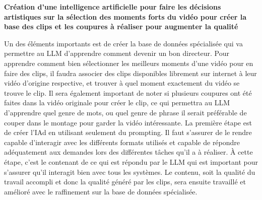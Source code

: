 \documentclass[livre]{udes-genie-these}
\begin{document}
\textbf{Création d'une intelligence artificielle pour faire les décisions artistiques sur la sélection des moments forts du vidéo pour créer la base des clips et les coupures à réaliser pour augmenter la qualité}

Un des éléments importants est de créer la base de données spécialisée qui va permettre au LLM d'apprendre comment devenir un bon directeur.
Pour apprendre comment bien sélectionner les meilleurs moments d'une vidéo pour en faire des clips, il faudra associer des clips disponibles librement sur internet à leur vidéo d'origine respective, et trouver à quel moment exactement du vidéo se trouve le clip. Il sera également important de noter si plusieurs coupures ont été faites dans la vidéo originale pour créer le clip, ce qui permettra au LLM d'apprendre quel genre de mots, ou quel genre de phrase il serait préférable de couper dans le montage pour garder la vidéo intéressante.
La première étape est de créer l'IAd en utilisant seulement du prompting. Il faut s'assurer de le rendre capable d'interagir avec les différents formats utilisés et capable de répondre adéquatement aux demandes lors des différentes tâches qu'il a à réaliser. À cette étape, c'est le contenant de ce qui est répondu par le LLM qui est important pour s'assurer qu'il interagit bien avec tous les systèmes. Le contenu, soit la qualité du travail accompli et donc la qualité généré par les clips, sera ensuite travaillé et amélioré avec le raffinement sur la base de données spécialisée.
\end{document}
